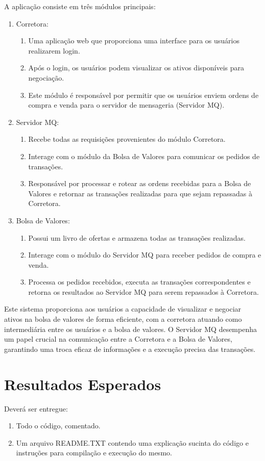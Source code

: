 \documentclass[12pt,brazil, a4paper, fullpage]{article}
\begin{document}
A aplicação consiste em três módulos principais:

\begin{enumerate}
    \item Corretora:
\begin{enumerate}
    \item Uma aplicação web que proporciona uma interface para os usuários realizarem login.
    \item Após o login, os usuários podem visualizar os ativos disponíveis para negociação.
    \item Este módulo é responsável por permitir que os usuários enviem ordens de compra e venda para o servidor de mensageria (Servidor MQ).
\end{enumerate}
    \item Servidor MQ:
\begin{enumerate}
    \item Recebe todas as requisições provenientes do módulo Corretora.
    \item Interage com o módulo da Bolsa de Valores para comunicar os pedidos de transações.
    \item Responsável por processar e rotear as ordens recebidas para a Bolsa de Valores e retornar as transações realizadas para que sejam repassadas à
Corretora.

\end{enumerate}
    \item Bolsa de Valores:
\begin{enumerate}
    \item Possui um livro de ofertas e armazena todas as transações realizadas.
    \item Interage com o módulo do Servidor MQ para receber pedidos de compra e venda.
    \item Processa os pedidos recebidos, executa as transações correspondentes e retorna os resultados ao Servidor MQ para serem repassados à Corretora.

    \end{enumerate}
\end{enumerate}

Este sistema proporciona aos usuários a capacidade de visualizar e negociar ativos na bolsa de valores de forma eficiente, com a corretora atuando como intermediária entre os usuários e a bolsa de valores. O Servidor MQ desempenha um papel crucial na comunicação entre a Corretora e a Bolsa de Valores, garantindo uma troca eficaz de informações e a execução precisa das transações.

\section{Resultados Esperados}

Deverá ser entregue:

\begin{enumerate}
    \item Todo o código, comentado.

    \item Um arquivo README.TXT contendo uma explicação sucinta do código e instruções para compilação e execução do mesmo.
\end{enumerate}
\end{document}
